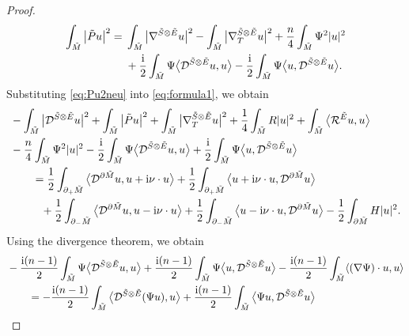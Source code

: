 \documentclass[11pt]{article}
\numberwithin{equation}{section}
\numberwithin{equation}{section}
\begin{document}
\begin{proof}
\begin{align}
\int_{\tilde{M}} \big|\tilde{P} u\big|^2
={}& \int_{\tilde{M}} \big|\nabla^{\tilde{S} \otimes \tilde{E}} u\big|^2 - \int_{\tilde{M}} \big|\nabla_T^{\tilde{S} \otimes \tilde{E}} u\big|^2 + \frac{n}{4} \int_{\tilde{M}} \Psi^2 |u|^2\nonumber \\
& + \frac{\rm i}{2} \int_{\tilde{M}} \Psi \big\langle \mathcal{D}^{\tilde{S} \otimes \tilde{E}} u,u \big\rangle - \frac{\rm i}{2} \int_{\tilde{M}} \Psi \big\langle u,\mathcal{D}^{\tilde{S} \otimes \tilde{E}} u \big\rangle.\label{eq:Pu2neu}
\end{align}
Substituting \eqref{eq:Pu2neu} into \eqref{eq:formula1}, we obtain
\begin{align}
&- \int_{\tilde{M}} \big|\mathcal{D}^{\tilde{S} \otimes \tilde{E}} u\big|^2 + \int_{\tilde{M}} \big|\tilde{P} u\big|^2 + \int_{\tilde{M}} \big|\nabla_T^{\tilde{S} \otimes \tilde{E}} u\big|^2 + \frac{1}{4} \int_{\tilde{M}} R |u|^2
+ \int_{\tilde{M}} \big\langle \mathcal{R}^{\tilde{E}} u,u \big\rangle \nonumber\\
&- \frac{n}{4} \int_{\tilde{M}} \Psi^2 |u|^2
 - \frac{\rm i}{2} \int_{\tilde{M}} \Psi \big\langle \mathcal{D}^{\tilde{S} \otimes \tilde{E}} u,u \big\rangle + \frac{\rm i}{2} \int_{\tilde{M}} \Psi \big\langle u,\mathcal{D}^{\tilde{S} \otimes \tilde{E}} u \big\rangle\nonumber \\
&\qquad= \frac{1}{2} \int_{\partial_+ \tilde{M}} \big\langle \mathcal{D}^{\partial \tilde{M}} u,u + {\rm i} \nu \cdot u \big\rangle + \frac{1}{2} \int_{\partial_+ \tilde{M}} \big\langle u + {\rm i} \nu \cdot u,\mathcal{D}^{\partial \tilde{M}} u \big\rangle\nonumber \\
&\qquad\phantom{=}{} + \frac{1}{2} \int_{\partial_- \tilde{M}} \big\langle \mathcal{D}^{\partial \tilde{M}} u,u - {\rm i} \nu \cdot u \big\rangle + \frac{1}{2} \int_{\partial_- \tilde{M}} \big\langle u - {\rm i} \nu \cdot u,\mathcal{D}^{\partial \tilde{M}} u \big\rangle - \frac{1}{2} \int_{\partial \tilde{M}} H |u|^2.\label{eq:formula2}
\end{align}
Using the divergence theorem, we obtain
\begin{align}
&- \frac{{\rm i}(n-1)}{2} \int_{\tilde{M}} \Psi \big\langle \mathcal{D}^{\tilde{S} \otimes \tilde{E}} u,u \big\rangle + \frac{{\rm i}(n-1)}{2} \int_{\tilde{M}} \Psi \big\langle u,\mathcal{D}^{\tilde{S} \otimes \tilde{E}} u \big\rangle
- \frac{{\rm i}(n-1)}{2} \int_{\tilde{M}} \langle (\nabla \Psi) \cdot u,u \rangle\nonumber \\
&\qquad= - \frac{{\rm i}(n-1)}{2} \int_{\tilde{M}} \big\langle \mathcal{D}^{\tilde{S} \otimes \tilde{E}} (\Psi u),u \big\rangle + \frac{{\rm i}(n-1)}{2} \int_{\tilde{M}} \big\langle \Psi u,\mathcal{D}^{\tilde{S} \otimes \tilde{E}} u \big\rangle\nonumber \\

\end{align}
\end{proof}
\end{document}

